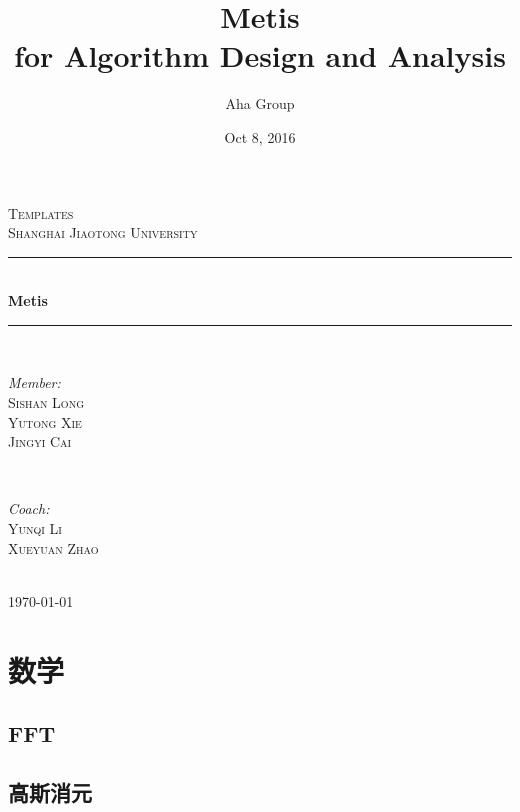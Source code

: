 \documentclass[11pt]{article}
\title{Metis \\ for Algorithm Design and Analysis}
\author{Aha Group}
\date{Oct 8, 2016}
\begin{document}
\begin{titlepage}

\newcommand{\HRule}{\rule{\linewidth}{0.5mm}}
\center
\textsc{\LARGE Templates}\\[1.5cm] 
\textsc{\Large Shanghai Jiaotong University}\\[0.5cm]
\HRule \\[0.4cm]
{ \huge \bfseries Metis}\\[0.4cm] 
\HRule \\[1.5cm]

\begin{minipage}{0.4\textwidth}
\begin{flushleft} \large
\emph{Member:}\\
 \textsc{Sishan Long \\ Yutong Xie \\ Jingyi Cai}
\end{flushleft}
\end{minipage}
~
\begin{minipage}{0.4\textwidth}
\begin{flushright} \large
\emph{Coach:} \\
\textsc{Yunqi Li \\ Xueyuan Zhao}
\end{flushright}
\end{minipage}\\[4cm]


{\large \today}\\[3cm] 

\vfill

\end{titlepage}
	\newpage	
	
	\tableofcontents
	\newpage
	
	\section{数学}
		\subsection{FFT}
		
		\subsection{高斯消元}
		
\end{document}
